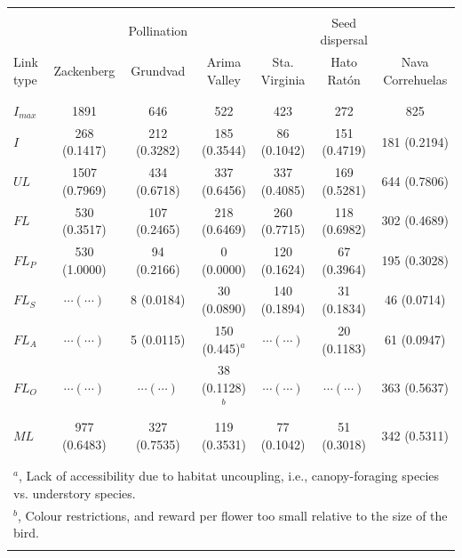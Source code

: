 \documentclass[12pt]{article}
\begin{document}
\begin{table}[h!]
  \caption{}
  \label{Table_2}
  \begin{center}
    \begin{tabular}{lcccccc}
      \hline
\\&& {Pollination} &&& {Seed dispersal}&\\
Link type&Zackenberg&Grundvad&Arima Valley&Sta. Virginia&Hato Rat\'on&Nava Correhuelas\\\\
      \hline
\\$I_{max}$&1891&646&522&423&272&825\\
$I$&268 (0.1417)&212 (0.3282)&185 (0.3544)& 86 (0.1042)&151 (0.4719)&181 (0.2194)\\
$UL$&1507 (0.7969)&434 (0.6718)&337 (0.6456)& 337 (0.4085)&169 (0.5281)&644 (0.7806)\\
$FL$&530 (0.3517)&107 (0.2465)&218 (0.6469)& 260 (0.7715)&118 (0.6982)&302 (0.4689)\\
$FL_P$&530 (1.0000)&94 (0.2166)&0 (0.0000)& 120 (0.1624)&67 (0.3964)&195 (0.3028)\\
$FL_S$& $\cdots(\cdots)$&8 (0.0184)&30 (0.0890)& 140 (0.1894)&31 (0.1834)&46 (0.0714)\\
$FL_A$&$\cdots(\cdots)$&5 (0.0115)&150 (0.445)$^a$&$\cdots(\cdots)$&20 (0.1183)&61 (0.0947)\\
$FL_O$&$\cdots(\cdots)$&$\cdots(\cdots)$&38 (0.1128)$^b$&$\cdots(\cdots)$&$\cdots(\cdots)$&363 (0.5637)\\
$ML$&977 (0.6483)&327 (0.7535)&119 (0.3531)& 77 (0.1042)&51 (0.3018)&342 (0.5311)\\\\
      \hline
\\\multicolumn{7}{l}{$^a$, Lack of accessibility due to habitat uncoupling, i.e., canopy-foraging species vs. understory species.}\\
\multicolumn{7}{l}{$^b$, Colour restrictions, and reward per flower too small relative to the size of the bird.}\\\\
      \hline
    \end{tabular}
  \end{center}
\end{table}
%
\newpage
\end{document}
